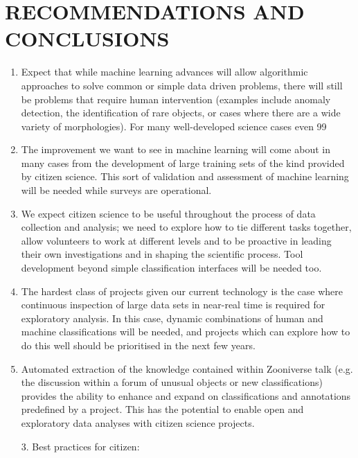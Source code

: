\documentclass{pasa}
\begin{document}
\section{RECOMMENDATIONS AND CONCLUSIONS}
\label{sec:conclusions}

\begin{enumerate} 

\item Expect that while machine learning advances will allow algorithmic approaches to solve common or simple data driven problems,  there will still be problems that require human intervention (examples include anomaly detection, the identification of rare objects, or cases where there are a wide variety of morphologies). For many well-developed science cases even 99%
\item The improvement we want to see in machine learning will come about in many cases from the development of large training sets of the kind provided by citizen science.  This sort of validation and assessment of machine learning will be needed while surveys are operational. 

\item We expect citizen science to be useful throughout the process of data collection and analysis; we need to explore how to tie different tasks together, allow volunteers to work at different levels and to be proactive in leading their own investigations and in shaping the scientific process. Tool development beyond simple classification interfaces will be needed too. 


\item The hardest class of projects given our current technology is the case where continuous inspection of large data sets in near-real time is required for exploratory analysis. In this case, dynamic combinations of human and machine classifications will be needed, and projects which can explore how to do this well should be prioritised in the next few years. 

\item Automated extraction of the knowledge contained within Zooniverse talk (e.g. the discussion within a forum of unusual objects or new classifications) provides the ability to enhance and expand on classifications and annotations predefined by a project. This has the potential to enable open and exploratory data analyses with citizen science projects.

3. Best practices for citizen: 


\end{enumerate}
\end{document}
